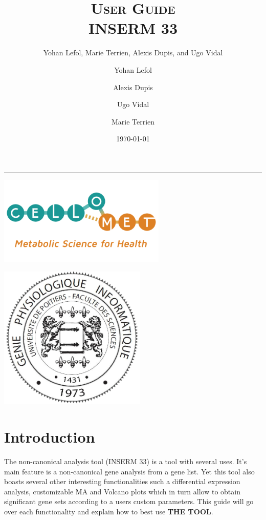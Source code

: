 \documentclass[11pt]{article}
\author{Yohan Lefol, Marie Terrien, Alexis Dupis, and Ugo Vidal}
\title{
\textsc{User Guide}\\[2.6cm]
{\LARGE \bfseries INSERM 33}
}
\author{
Yohan Lefol
\and 
Alexis Dupis
\and
Ugo Vidal
\and
Marie Terrien
}
\date{
\today
}
\begin{document}
\maketitle
\hrule
\begin{center}
\includegraphics[width = 8cm]{logo-CELLOMET-a.png}
\end{center}

\begin{center}
\includegraphics[width = 7cm]{Logo-Master-GPhy.png}
\end{center}
\newpage
\section{Introduction \label{intro}}
The non-canonical analysis tool (INSERM 33) is a tool with several uses. It's main feature is a non-canonical gene analysis from a gene list. Yet this tool also boasts several other interesting functionalities such a differential expression analysis, customizable MA and Volcano plots which in turn allow to obtain significant gene sets according to a users custom parameters.
This guide will go over each functionality and explain how to best use \textbf{THE TOOL}.
\end{document}
